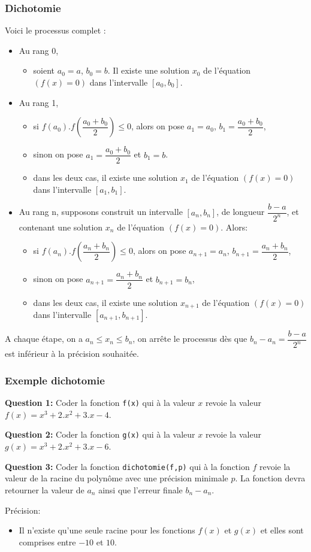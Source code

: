 \begin{frame}[fragile]
\frametitle{Dichotomie}

Voici le processus complet :
\begin{itemize}
 \item Au rang 0,
 \begin{itemize}
  \item soient $a_0=a$, $b_0=b$. Il existe une solution $x_0$ de l'équation $(f(x)=0)$ dans l'intervalle $[a_0,b_0]$.
 \end{itemize}
 \item Au rang 1,
 \begin{itemize}
  \item si $f(a_0).f(\dfrac{a_0+b_0}{2})\leq 0$, alors on pose $a_1=a_0$, $b_1=\dfrac{a_0+b_0}{2}$,
  \item sinon on pose $a_{1}=\dfrac{a_0+b_0}{2}$ et $b_1=b$.
  \item dans les deux cas, il existe une solution $x_1$ de l'équation $(f(x)=0)$ dans l'intervalle $[a_1,b_1]$.
 \end{itemize}
 \item Au rang n, supposons construit un intervalle $[a_n,b_n]$, de longueur $\dfrac{b-a}{2^n}$,  et contenant une solution $x_n$ de l'équation $(f(x)=0)$. Alors:
 \begin{itemize}
  \item  si $f(a_n).f(\dfrac{a_n+b_n}{2})\leq 0$, alors on pose $a_{n+1}=a_n$, $b_{n+1}=\dfrac{a_n+b_n}{2}$,
  \item sinon on pose $a_{n+1}=\dfrac{a_n+b_n}{2}$ et $b_{n+1}=b_{n}$,
  \item dans les deux cas, il existe une solution $x_{n+1}$ de l'équation $(f(x)=0)$ dans l'intervalle $[a_{n+1},b_{n+1}]$.
 \end{itemize}
\end{itemize}

A chaque étape, on a $a_n\leq x_n \leq b_n$, on arrête le processus dès que $b_n-a_n=\dfrac{b-a}{2^n}$ est inférieur à la précision souhaitée.
\end{frame}

\begin{frame}[fragile]
\frametitle{Exemple dichotomie}

\textbf{Question 1:} Coder la fonction \verb?f(x)? qui à la valeur $x$ revoie la valeur $f(x)=x^3+2.x^2+3.x-4$.

\textbf{Question 2:} Coder la fonction \verb?g(x)? qui à la valeur $x$ revoie la valeur $g(x)=x^3+2.x^2+3.x-6$.

\textbf{Question 3:} Coder la fonction \verb?dichotomie(f,p)? qui à la fonction $f$ revoie la valeur de la racine du polynôme avec une précision minimale $p$. La fonction devra retourner la valeur de $a_n$ ainsi que l'erreur finale $b_n-a_n$.

Précision: \\
\begin{itemize}
 \item Il n'existe qu'une seule racine pour les fonctions $f(x)$ et $g(x)$ et elles sont comprises entre $-10$ et $10$.
\end{itemize}

\end{frame}


